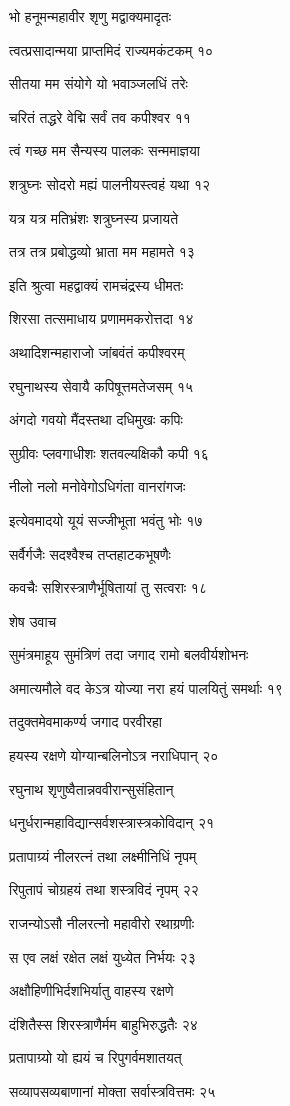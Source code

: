 भो हनूमन्महावीर शृणु मद्वाक्यमादृतः

त्वत्प्रसादान्मया प्राप्तमिदं राज्यमकंटकम् १०

सीतया मम संयोगे यो भवाञ्जलधिं तरेः

चरितं तद्धरे वेद्मि सर्वं तव कपीश्वर ११

त्वं गच्छ मम सैन्यस्य पालकः सन्ममाज्ञया

शत्रुघ्नः सोदरो मह्यं पालनीयस्त्वहं यथा १२

यत्र यत्र मतिभ्रंशः शत्रुघ्नस्य प्रजायते

तत्र तत्र प्रबोद्धव्यो भ्राता मम महामते १३

इति श्रुत्वा महद्वाक्यं रामचंद्रस्य धीमतः

शिरसा तत्समाधाय प्रणाममकरोत्तदा १४

अथादिशन्महाराजो जांबवंतं कपीश्वरम्

रघुनाथस्य सेवायै कपिषूत्तमतेजसम् १५

अंगदो गवयो मैंदस्तथा दधिमुखः कपिः

सुग्रीवः प्लवगाधीशः शतवल्यक्षिकौ कपी १६

नीलो नलो मनोवेगोऽधिगंता वानरांगजः

इत्येवमादयो यूयं सज्जीभूता भवंतु भोः १७

सर्वैर्गजैः सदश्वैश्च तप्तहाटकभूषणैः

कवचैः सशिरस्त्राणैर्भूषितायां तु सत्वराः १८

शेष उवाच

सुमंत्रमाहूय सुमंत्रिणं तदा जगाद रामो बलवीर्यशोभनः

अमात्यमौले वद केऽत्र योज्या नरा हयं पालयितुं समर्थाः १९

तदुक्तमेवमाकर्ण्य जगाद परवीरहा

हयस्य रक्षणे योग्यान्बलिनोऽत्र नराधिपान् २०

रघुनाथ शृणुष्वैतान्नववीरान्सुसंहितान्

धनुर्धरान्महाविद्यान्सर्वशस्त्रास्त्रकोविदान् २१

प्रतापाग्र्यं नीलरत्नं तथा लक्ष्मीनिधिं नृपम्

रिपुतापं चोग्रहयं तथा शस्त्रविदं नृपम् २२

राजन्योऽसौ नीलरत्नो महावीरो रथाग्रणीः

स एव लक्षं रक्षेत लक्षं युध्येत निर्भयः २३

अक्षौहिणीभिर्दशभिर्यातु वाहस्य रक्षणे

दंशितैस्स शिरस्त्राणैर्मम बाहुभिरुद्धतैः २४

प्रतापाग्र्यो यो ह्ययं च रिपुगर्वमशातयत्

सव्यापसव्यबाणानां मोक्ता सर्वास्त्रवित्तमः २५

